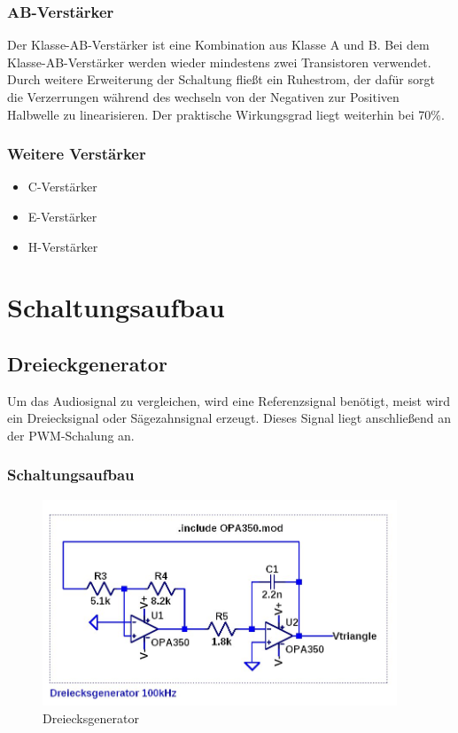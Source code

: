 \documentclass[11pt,a4paper,bibtotoc,oneside]{scrbook}
\begin{document}
\subsection{AB-Verstärker}
Der Klasse-AB-Verstärker ist eine Kombination aus Klasse A und B. Bei dem Klasse-AB-Verstärker werden wieder mindestens
zwei Transistoren verwendet. Durch weitere Erweiterung der Schaltung fließt ein Ruhestrom, der dafür sorgt die
Verzerrungen während des wechseln von der Negativen zur Positiven Halbwelle zu linearisieren.
Der praktische Wirkungsgrad liegt weiterhin bei 70\%.
\textcolor{blue}{\cite{csA}}
\subsection{Weitere Verstärker}
\begin{itemize}
    \item C-Verstärker
    \item E-Verstärker
    \item    H-Verstärker
\end{itemize}
\chapter[Dreieckgenerator, Komparator-Schaltung und Treiberstufe]{Schaltungsaufbau}
\section{Dreieckgenerator}
Um das Audiosignal zu vergleichen,  wird eine Referenzsignal benötigt, meist wird ein Dreiecksignal oder
Sägezahnsignal erzeugt. Dieses Signal liegt anschließend an der PWM-Schalung an.
\subsection{Schaltungsaufbau}
    \begin{figure}[ht]
    \centering
        \includegraphics[width=300pt]{./picture/dreiecksgenerator.png}
        \caption{\label{lm324}{Dreiecksgenerator}}
    \end{figure}
\end{document}
